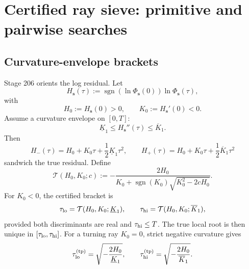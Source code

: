 
\section{Certified ray sieve: primitive and pairwise searches}
\label{sec:part06-certified-ray-sieve-primitive-pairwise}

\subsection{Curvature-envelope brackets}
\label{subsec:part06-curvature-envelope-brackets}

Stage 206 orients the log residual.  Let
\begin{equation}
\label{eq:part06-oriented-H}
H_{\mathbf s}(\tau):=
\operatorname{sgn}(\ln\Phi_{\mathbf s}(0))\ln\Phi_{\mathbf s}(\tau),
\end{equation}
with
\begin{equation}
\label{eq:part06-H0-K0}
H_0:=H_{\mathbf s}(0)>0,
\qquad
K_0:=H_{\mathbf s}'(0)<0.
\end{equation}
Assume a curvature envelope on \([0,T]\):
\begin{equation}
\label{eq:part06-curvature-envelope}
\underline K_1\le H_{\mathbf s}''(\tau)\le\overline K_1.
\end{equation}
Then
\begin{equation}
\label{eq:part06-comparison-functions}
H_-(\tau)=H_0+K_0\tau+\frac12\underline K_1\tau^2,
\qquad
H_+(\tau)=H_0+K_0\tau+\frac12\overline K_1\tau^2
\end{equation}
sandwich the true residual.  Define
\begin{equation}
\label{eq:part06-root-map}
\mathcal T(H_0,K_0;c)
:=-\frac{2H_0}{K_0+\operatorname{sgn}(K_0)\sqrt{K_0^2-2cH_0}}.
\end{equation}
For \(K_0<0\), the certified bracket is
\begin{equation}
\label{eq:part06-certified-bracket}
\tau_{\rm lo}=\mathcal T(H_0,K_0;\underline K_1),
\qquad
\tau_{\rm hi}=\mathcal T(H_0,K_0;\overline K_1),
\end{equation}
provided both discriminants are real and \(\tau_{\rm hi}\le T\).  The true local root is then unique in \([\tau_{\rm lo},\tau_{\rm hi}]\).  For a turning ray \(K_0=0\), strict negative curvature gives
\begin{equation}
\label{eq:part06-turning-bracket}
\tau_{\rm lo}^{\rm(tp)}=\sqrt{-\frac{2H_0}{\underline K_1}},
\qquad
\tau_{\rm hi}^{\rm(tp)}=\sqrt{-\frac{2H_0}{\overline K_1}}.
\end{equation}

